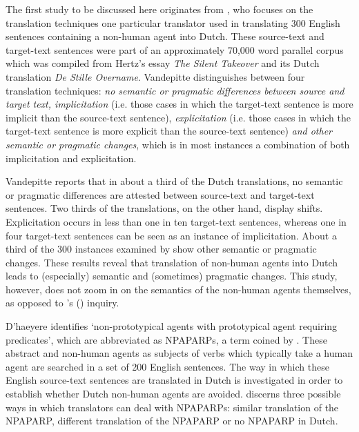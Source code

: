 \documentclass[output=paper]{LSP/langsci}
\begin{document}
The first study to be discussed here originates from  \citet{Vandepitte2007}, who focuses on the translation techniques one particular translator used in translating 300 English sentences containing a non-human agent into Dutch. These source-text and target-text sentences were part of an approximately 70,000 word parallel corpus which was compiled from Hertz’s essay \textit{The Silent Takeover} and its Dutch translation \textit{De Stille Overname}. Vandepitte distinguishes between four translation techniques: \textit{no semantic or pragmatic differences between source and target text, implicitation} (i.e. those cases in which the target-text sentence is more implicit than the source-text sentence), \textit{explicitation} (i.e. those cases in which the target-text sentence is more explicit than the source-text sentence) \textit{and other semantic or pragmatic changes}, which is in most instances a combination of both implicitation and explicitation.

Vandepitte reports that in about a third of the Dutch translations, no semantic or pragmatic differences are attested between source-text and target-text sentences. Two thirds of the translations, on the other hand, display shifts. Explicitation occurs in less than one in ten target-text sentences, whereas one in four target-text sentences can be seen as an instance of implicitation. About a third of the 300 instances examined by \citet{Vandepitte2007} show other semantic or pragmatic changes. These results reveal that translation of non-human agents into Dutch leads to (especially) semantic and (sometimes) pragmatic changes. This study, however, does not zoom in on the semantics of the non-human agents themselves, as opposed to \citeauthor{Dhaeyere2010}'s (\citeyear{Dhaeyere2010}) inquiry. 
	

D’haeyere identifies ‘non-prototypical agents with prototypical agent requiring predicates’, which are abbreviated as NPAPARPs, a term coined by \citet{Vandepitte2010}. These abstract and non-human agents as subjects of verbs which typically take a human agent are searched in a set of 200 English sentences. The way in which these English source-text sentences are translated in Dutch is investigated in order to establish whether Dutch non-human agents are avoided. \citet{Dhaeyere2010} discerns three possible ways in which translators can deal with NPAPARPs: similar translation of the NPAPARP, different translation of the NPAPARP or no NPAPARP in Dutch.  
\end{document}
